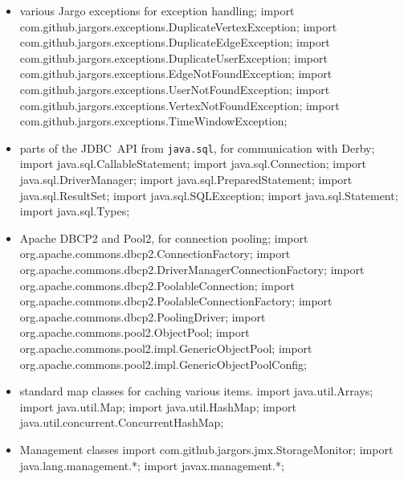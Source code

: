 \begin{itemize}
\item various Jargo exceptions for exception handling;
\nwenddocs{}\plusendmoddef
import com.github.jargors.exceptions.DuplicateVertexException;
import com.github.jargors.exceptions.DuplicateEdgeException;
import com.github.jargors.exceptions.DuplicateUserException;
import com.github.jargors.exceptions.EdgeNotFoundException;
import com.github.jargors.exceptions.UserNotFoundException;
import com.github.jargors.exceptions.VertexNotFoundException;
import com.github.jargors.exceptions.TimeWindowException;
\nwendcode{}\item parts of the JDBC~API from {\tt{}java.sql}, for communication with Derby;
\nwenddocs{}\plusendmoddef
import java.sql.CallableStatement;   import java.sql.Connection;
import java.sql.DriverManager;       import java.sql.PreparedStatement;
import java.sql.ResultSet;           import java.sql.SQLException;
import java.sql.Statement;           import java.sql.Types;
\nwendcode{}\item Apache DBCP2 and Pool2, for connection pooling;
\nwenddocs{}\plusendmoddef
import org.apache.commons.dbcp2.ConnectionFactory;
import org.apache.commons.dbcp2.DriverManagerConnectionFactory;
import org.apache.commons.dbcp2.PoolableConnection;
import org.apache.commons.dbcp2.PoolableConnectionFactory;
import org.apache.commons.dbcp2.PoolingDriver;
import org.apache.commons.pool2.ObjectPool;
import org.apache.commons.pool2.impl.GenericObjectPool;
import org.apache.commons.pool2.impl.GenericObjectPoolConfig;
\nwendcode{}\item standard map classes for caching various items.
\nwenddocs{}\plusendmoddef
import java.util.Arrays;
import java.util.Map;
import java.util.HashMap;
import java.util.concurrent.ConcurrentHashMap;
\nwendcode{}\item Management classes
\nwenddocs{}\plusendmoddef
import com.github.jargors.jmx.StorageMonitor;
import java.lang.management.*;
import javax.management.*;
\nwendcode{}\nwdocspar
\end{itemize}

